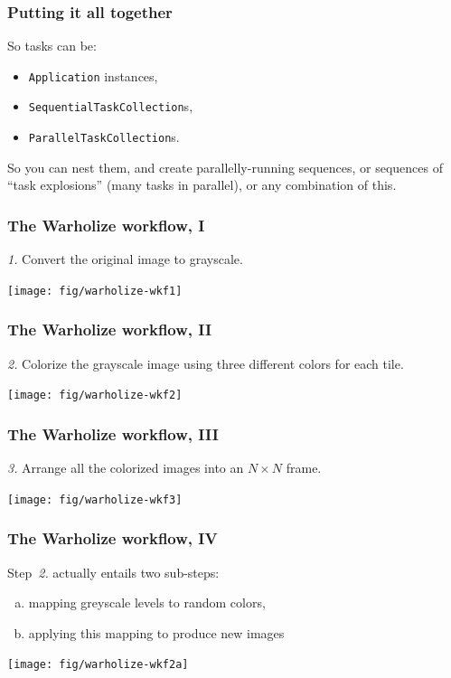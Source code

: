 \documentclass[english,serif,mathserif,xcolor=pdftex,dvipsnames,table]{beamer}
\begin{document}
\begin{frame}
  \frametitle{Putting it all together}
  So tasks can be:
  \begin{itemize}
  \item \texttt{Application} instances,
  \item \texttt{SequentialTaskCollection}s,
  \item \texttt{ParallelTaskCollection}s.
  \end{itemize}

  \+
  So you can nest them, and create parallelly-running sequences, or
  sequences of ``task explosions'' (many tasks in parallel), or any
  combination of this.
\end{frame}


\begin{frame}
  \frametitle{The Warholize workflow, I}

  {\color{gray}\itshape 1.}
  Convert the original image to grayscale.

  \+
  \texttt{[image: fig/warholize-wkf1]}
\end{frame}


\begin{frame}
  \frametitle{The Warholize workflow, II}

  {\color{gray}\itshape 2.}
  Colorize the grayscale image using three different colors for each tile.

  \+
  \texttt{[image: fig/warholize-wkf2]}
\end{frame}


\begin{frame}
  \frametitle{The Warholize workflow, III}

  {\color{gray}\itshape 3.}
  Arrange all the colorized images into an $N\times N$ frame.

  \+
  \texttt{[image: fig/warholize-wkf3]}
\end{frame}


\begin{frame}
  \frametitle{The Warholize workflow, IV}

  Step~\textit{2.} actually entails two sub-steps:
  \begin{enumerate}[a)]
  \item mapping greyscale levels to random colors,
  \item applying this mapping to produce new images
  \end{enumerate}

  \+
  \texttt{[image: fig/warholize-wkf2a]}
\end{frame}
\end{document}
